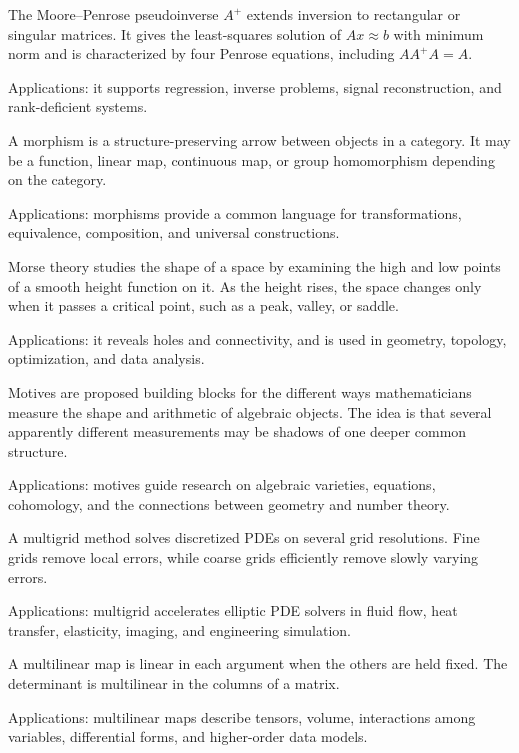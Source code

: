 The Moore--Penrose pseudoinverse $A^+$ extends inversion to rectangular or singular matrices. It gives the least-squares solution of $Ax\approx b$ with minimum norm and is characterized by four Penrose equations, including $AA^+A=A$. \par\noindent Applications: it supports regression, inverse problems, signal reconstruction, and rank-deficient systems.

A morphism is a structure-preserving arrow between objects in a category. It may be a function, linear map, continuous map, or group homomorphism depending on the category. \par\noindent Applications: morphisms provide a common language for transformations, equivalence, composition, and universal constructions.

Morse theory studies the shape of a space by examining the high and low points of a smooth height function on it. As the height rises, the space changes only when it passes a critical point, such as a peak, valley, or saddle. \par\noindent Applications: it reveals holes and connectivity, and is used in geometry, topology, optimization, and data analysis.

Motives are proposed building blocks for the different ways mathematicians measure the shape and arithmetic of algebraic objects. The idea is that several apparently different measurements may be shadows of one deeper common structure. \par\noindent Applications: motives guide research on algebraic varieties, equations, cohomology, and the connections between geometry and number theory.

A multigrid method solves discretized PDEs on several grid resolutions. Fine grids remove local errors, while coarse grids efficiently remove slowly varying errors. \par\noindent Applications: multigrid accelerates elliptic PDE solvers in fluid flow, heat transfer, elasticity, imaging, and engineering simulation.

A multilinear map is linear in each argument when the others are held fixed. The determinant is multilinear in the columns of a matrix. \par\noindent Applications: multilinear maps describe tensors, volume, interactions among variables, differential forms, and higher-order data models.


